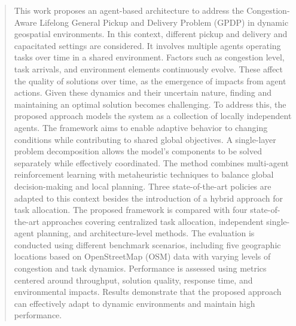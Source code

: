 \documentclass[sigconf]{acmart}
\begin{document}
\begin{abstract}
This work proposes an agent-based architecture to address the Congestion-Aware Lifelong General Pickup and Delivery Problem (GPDP) in dynamic geospatial environments. In this context, different pickup and delivery and capacitated settings are considered. It involves multiple agents operating tasks over time in a shared environment. Factors such as congestion level, task arrivals, and environment elements continuously evolve. These affect the quality of solutions over time, as the emergence of impacts from agent actions. Given these dynamics and their uncertain nature, finding and maintaining an optimal solution becomes challenging. To address this, the proposed approach models the system as a collection of locally independent agents. The framework aims to enable adaptive behavior to changing conditions while contributing to shared global objectives. A single-layer problem decomposition allows the model’s components to be solved separately while effectively coordinated. The method combines multi-agent reinforcement learning with metaheuristic techniques to balance global decision-making and local planning. Three state-of-the-art policies are adapted to this context besides the introduction of a hybrid approach for task allocation. The proposed framework is compared with four state-of-the-art approaches covering centralized task allocation, independent single-agent planning, and architecture-level methods. The evaluation is conducted using different benchmark scenarios, including five geographic locations based on OpenStreetMap (OSM) data with varying levels of congestion and task dynamics. Performance is assessed using metrics centered around throughput, solution quality, response time, and environmental impacts. Results demonstrate that the proposed approach can effectively adapt to dynamic environments and maintain high performance.
\end{abstract}
\end{document}
